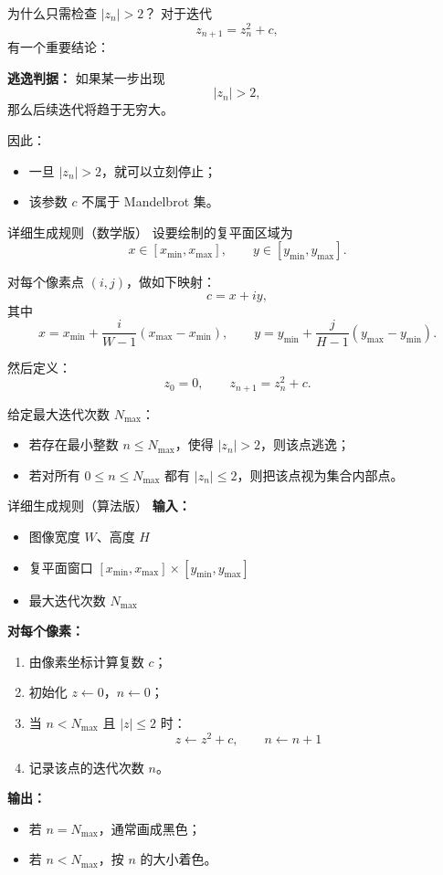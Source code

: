 \documentclass[UTF8]{ctexbeamer}
\begin{document}
\begin{frame}{为什么只需检查 \texorpdfstring{\(|z_n|>2\)}{|z_n| > 2}？}
对于迭代
\[
z_{n+1}=z_n^2+c,
\]
有一个重要结论：

\medskip
\textbf{逃逸判据：}
如果某一步出现
\[
|z_n|>2,
\]
那么后续迭代将趋于无穷大。

\medskip
因此：
\begin{itemize}
    \item 一旦 \(|z_n|>2\)，就可以立刻停止；
    \item 该参数 \(c\) 不属于 Mandelbrot 集。
\end{itemize}
\end{frame}

\begin{frame}{详细生成规则（数学版）}
设要绘制的复平面区域为
\[
x \in [x_{\min}, x_{\max}], \qquad
y \in [y_{\min}, y_{\max}].
\]

对每个像素点 \((i,j)\)，做如下映射：
\[
c = x + iy,
\]
其中
\[
x = x_{\min} + \frac{i}{W-1}(x_{\max}-x_{\min}),
\qquad
y = y_{\min} + \frac{j}{H-1}(y_{\max}-y_{\min}).
\]

然后定义：
\[
z_0 = 0,
\qquad
z_{n+1}=z_n^2+c.
\]

给定最大迭代次数 \(N_{\max}\)：
\begin{itemize}
    \item 若存在最小整数 \(n\le N_{\max}\)，使得 \(|z_n|>2\)，则该点逃逸；
    \item 若对所有 \(0\le n\le N_{\max}\) 都有 \(|z_n|\le 2\)，则把该点视为集合内部点。
\end{itemize}
\end{frame}

\begin{frame}{详细生成规则（算法版）}
\textbf{输入：}
\begin{itemize}
    \item 图像宽度 \(W\)、高度 \(H\)
    \item 复平面窗口 \([x_{\min},x_{\max}] \times [y_{\min},y_{\max}]\)
    \item 最大迭代次数 \(N_{\max}\)
\end{itemize}

\textbf{对每个像素：}
\begin{enumerate}
    \item 由像素坐标计算复数 \(c\)；
    \item 初始化 \(z \leftarrow 0\)，\(n \leftarrow 0\)；
    \item 当 \(n < N_{\max}\) 且 \(|z| \le 2\) 时：
    \[
    z \leftarrow z^2 + c,\qquad n \leftarrow n+1
    \]
    \item 记录该点的迭代次数 \(n\)。
\end{enumerate}

\textbf{输出：}
\begin{itemize}
    \item 若 \(n=N_{\max}\)，通常画成黑色；
    \item 若 \(n<N_{\max}\)，按 \(n\) 的大小着色。
\end{itemize}
\end{frame}
\end{document}
